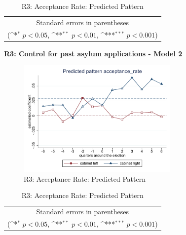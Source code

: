 \documentclass[10pt,a4paper]{scrartcl}
\begin{document}
\begin{table}[!ht]\centering
	\renewcommand{\arraystretch}{1.25}
	\def\sym#1{\ifmmode^{#1}\else\(^{#1}\)\fi}
	\caption{R3: Acceptance Rate: Predicted Pattern}
	\begin{tabular}{l*{2}{c}}
		\hline\hline
		
		\hline\hline
		\multicolumn{3}{c}{\footnotesize Standard errors in parentheses} \\
	    \multicolumn{3}{c}{\footnotesize (\sym{*} \(p<0.05\), \sym{**} \(p<0.01\), \sym{***} \(p<0.001\))}\\
	\end{tabular}
\end{table}

\clearpage
\textbf{R3: Control for past asylum applications - Model 2}
\begin{figure}[!ht]
	\centering
	\includegraphics[width=0.7\textwidth]{figures_edited/acceptance_rate_graph2_R3.pdf}
	\caption{R3: Acceptance Rate: Predicted Pattern}
\end{figure}

\begin{table}[!ht]\centering
	\footnotesize
	\renewcommand{\arraystretch}{1.2}
	\def\sym#1{\ifmmode^{#1}\else\(^{#1}\)\fi}
	\caption{R3: Acceptance Rate: Predicted Pattern}
	\begin{tabular}{l*{2}{c}}
		\hline\hline
		
		\hline\hline
		\multicolumn{3}{c}{\footnotesize Standard errors in parentheses} \\
		\multicolumn{3}{c}{\footnotesize (\sym{*} \(p<0.05\), \sym{**} \(p<0.01\), \sym{***} \(p<0.001\))} \\
	\end{tabular}
\end{table}
\end{document}
